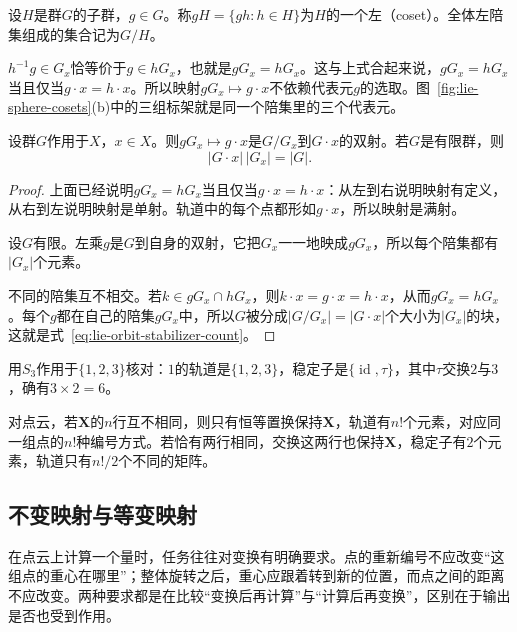\begin{definition}[陪集]
\label{def:lie-coset}
设$H$是群$G$的子群，$g\in G$。称$gH=\{gh:h\in H\}$为$H$的一个左（coset）。全体左陪集组成的集合记为$G/H$。
\end{definition}

$h^{-1}g\in G_x$恰等价于$g\in hG_x$，也就是$gG_x=hG_x$。这与上式合起来说，$gG_x=hG_x$当且仅当$g\cdot x=h\cdot x$。所以映射$gG_x\mapsto g\cdot x$不依赖代表元$g$的选取。图~\ref{fig:lie-sphere-cosets}(b)中的三组标架就是同一个陪集里的三个代表元。

\begin{theorem}[轨道—稳定子关系]
\label{thm:lie-orbit-stabilizer}
设群$G$作用于$X$，$x\in X$。则$gG_x\mapsto g\cdot x$是$G/G_x$到$G\cdot x$的双射。若$G$是有限群，则
\begin{equation}
 \lvert G\cdot x\rvert\,\lvert G_x\rvert=\lvert G\rvert .
 \label{eq:lie-orbit-stabilizer-count}
\end{equation}
\end{theorem}

\begin{proof}
上面已经说明$gG_x=hG_x$当且仅当$g\cdot x=h\cdot x$：从左到右说明映射有定义，从右到左说明映射是单射。轨道中的每个点都形如$g\cdot x$，所以映射是满射。

设$G$有限。左乘$g$是$G$到自身的双射，它把$G_x$一一地映成$gG_x$，所以每个陪集都有$\lvert G_x\rvert$个元素。

不同的陪集互不相交。若$k\in gG_x\cap hG_x$，则$k\cdot x=g\cdot x=h\cdot x$，从而$gG_x=hG_x$。每个$g$都在自己的陪集$gG_x$中，所以$G$被分成$\lvert G/G_x\rvert=\lvert G\cdot x\rvert$个大小为$\lvert G_x\rvert$的块，这就是式~\eqref{eq:lie-orbit-stabilizer-count}。
\end{proof}

用$S_3$作用于$\{1,2,3\}$核对：$1$的轨道是$\{1,2,3\}$，稳定子是$\{\operatorname{id},\tau\}$，其中$\tau$交换$2$与$3$，确有$3\times2=6$。

对点云，若$\bm X$的$n$行互不相同，则只有恒等置换保持$\bm X$，轨道有$n!$个元素，对应同一组点的$n!$种编号方式。若恰有两行相同，交换这两行也保持$\bm X$，稳定子有$2$个元素，轨道只有$n!/2$个不同的矩阵。

\subsection{不变映射与等变映射}
\label{sec:lie-invariant-equivariant}

在点云上计算一个量时，任务往往对变换有明确要求。点的重新编号不应改变“这组点的重心在哪里”；整体旋转之后，重心应跟着转到新的位置，而点之间的距离不应改变。两种要求都是在比较“变换后再计算”与“计算后再变换”，区别在于输出是否也受到作用。

